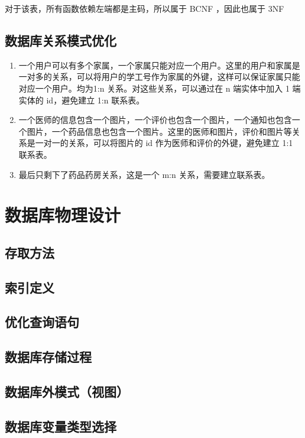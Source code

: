 \documentclass{article}
\begin{document}
对于该表，所有函数依赖左端都是主码，所以属于 BCNF ，因此也属于 3NF

\subsection{数据库关系模式优化}

\begin{enumerate}
    \item 一个用户可以有多个家属，一个家属只能对应一个用户。这里的用户和家属是一对多的关系，可以将用户的学工号作为家属的外键，这样可以保证家属只能对应一个用户。均为1:n 关系。对这些关系，可以通过在 n 端实体中加入 1 端实体的 id，避免建立 1:n 联系表。
    \item 一个医师的信息包含一个图片，一个评价也包含一个图片，一个通知也包含一个图片，一个药品信息也包含一个图片。这里的医师和图片，评价和图片等关系是一对一的关系，可以将图片的 id 作为医师和评价的外键，避免建立 1:1 联系表。
    \item 最后只剩下了药品药房关系，这是一个 m:n 关系，需要建立联系表。
\end{enumerate}

\section{数据库物理设计}

\subsection{存取方法}

\subsection{索引定义}

\subsection{优化查询语句}

\subsection{数据库存储过程}

\subsection{数据库外模式（视图）}

\subsection{数据库变量类型选择}
\end{document}
